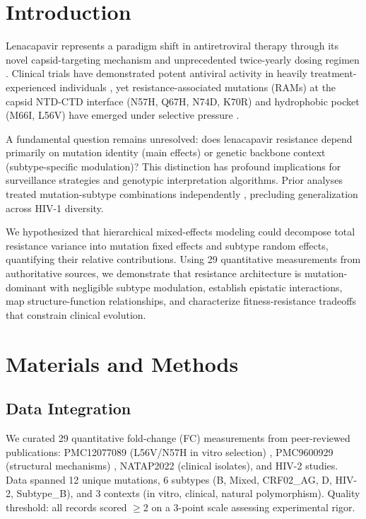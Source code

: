 \documentclass[preprint]{elsarticle}
\begin{document}
\section{Introduction}

Lenacapavir represents a paradigm shift in antiretroviral therapy through its novel capsid-targeting mechanism and unprecedented twice-yearly dosing regimen \cite{Link2020}. Clinical trials have demonstrated potent antiviral activity in heavily treatment-experienced individuals \cite{Segal2022}, yet resistance-associated mutations (RAMs) at the capsid NTD-CTD interface (N57H, Q67H, N74D, K70R) and hydrophobic pocket (M66I, L56V) have emerged under selective pressure \cite{Margot2023}.

A fundamental question remains unresolved: does lenacapavir resistance depend primarily on mutation identity (main effects) or genetic backbone context (subtype-specific modulation)? This distinction has profound implications for surveillance strategies and genotypic interpretation algorithms. Prior analyses treated mutation-subtype combinations independently \cite{Andreatta2024}, precluding generalization across HIV-1 diversity.

We hypothesized that hierarchical mixed-effects modeling could decompose total resistance variance into mutation fixed effects and subtype random effects, quantifying their relative contributions. Using 29 quantitative measurements from authoritative sources, we demonstrate that resistance architecture is mutation-dominant with negligible subtype modulation, establish epistatic interactions, map structure-function relationships, and characterize fitness-resistance tradeoffs that constrain clinical evolution.

\section{Materials and Methods}

\subsection{Data Integration}

We curated 29 quantitative fold-change (FC) measurements from peer-reviewed publications: PMC12077089 (L56V/N57H in vitro selection) \cite{Andreatta2024}, PMC9600929 (structural mechanisms) \cite{Yant2022}, NATAP2022 (clinical isolates), and HIV-2 studies. Data spanned 12 unique mutations, 6 subtypes (B, Mixed, CRF02\_AG, D, HIV-2, Subtype\_B), and 3 contexts (in vitro, clinical, natural polymorphism). Quality threshold: all records scored $\geq$2 on a 3-point scale assessing experimental rigor.
\end{document}
